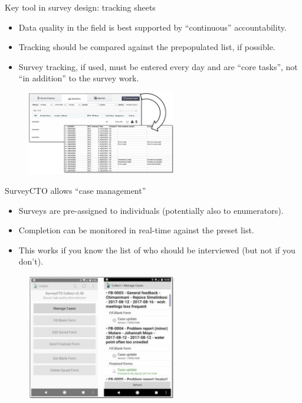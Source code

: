 \documentclass[aspectratio=169]{beamer}
\begin{document}
\begin{frame}[fragile]{Key tool in survey design: tracking sheets}
\begin{multicols}{2}	
	
	\begin{itemize}[<default overlay specification>]
		\item<1> Data quality in the field is best supported by “continuous” accountability.
		\item<1> Tracking should be compared against the prepopulated list, if possible.
		\item<1> Survey tracking, if used, must be entered every day and are “core tasks”, not “in addition” to the survey work. 
	\end{itemize}
	
	\begin{figure}
		\centering
		\includegraphics[width=65mm, right]{img/Survey3}
	\end{figure}
	
\end{multicols}
\end{frame}



\begin{frame}[fragile]{SurveyCTO allows “case management”}
\begin{multicols}{2}	
	
	\begin{itemize}[<default overlay specification>]
		\item<1> Surveys are pre-assigned to individuals (potentially also to enumerators).
		\item<1> Completion can be monitored in real-time against the preset list.
		\item<1> This works if you know the list of who should be interviewed (but not if you don’t).
	\end{itemize}
	
	\begin{figure}
		\centering
		\includegraphics[width=65mm, right]{img/Survey4}
	\end{figure}
	
\end{multicols}
\end{frame}
\end{document}
